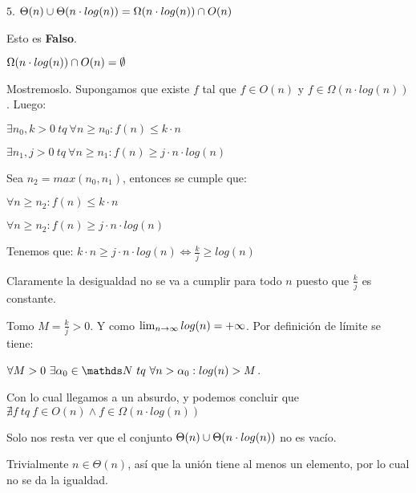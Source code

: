 \documentclass[10pt,a4paper]{article}
\begin{document}
\demoline
\demoline
\par $5.$ \ensuremath{\Theta(n) \union \Theta(n \cdot log(n))= \Omega(n \cdot log(n)) \interseccion O(n)} 
\demoline
\begin{groupIzq}{2.5em}
  \par Esto es \textbf{Falso}.
  \par \ensuremath{\Omega(n \cdot log(n)) \interseccion O(n) = \emptyset}
  \par Mostremoslo. Supongamos que existe \ensuremath{f} tal que \ensuremath{f \in O(n)} y \ensuremath{f \in \Omega(n \cdot log(n))}. Luego:
  \begin{groupIzq}{1em}
    \par \ensuremath{\exists n_0, k > 0\ tq\ \forall n \geq n_0 : f(n) \leq k \cdot n}
    \par \ensuremath{\exists n_1, j > 0\ tq\ \forall n \geq n_1 : f(n) \geq j \cdot n \cdot log(n)}
    \par Sea \ensuremath{n_2=max(n_0, n_1)}, entonces se cumple que:
    \par \ensuremath{\forall n \geq n_2 : f(n) \leq k \cdot n}
    \par \ensuremath{\forall n \geq n_2 : f(n) \geq j \cdot n \cdot log(n)}
    \par Tenemos que: \ensuremath{k \cdot n \geq j \cdot n \cdot log(n) \Leftrightarrow \frac{k}{j} \geq log(n)}
    \par Claramente la desigualdad no se va a cumplir para todo \ensuremath{n} puesto que \ensuremath{\frac{k}{j}} es constante.
    \par Tomo \ensuremath{M = \frac{k}{j} > 0}. Y como \ensuremath{\limn log(n) = +\infty}. Por definición de límite se tiene:
    \par \ensuremath{\forall M > 0 \ \exists \alpha_0 \in \nat \ tq\ \forall n > \alpha_0 : log(n) > M}.
  \end{groupIzq}
  \par Con lo cual llegamos a un absurdo, y podemos concluir que \ensuremath{\nexists f\ tq\ f \in O(n) \land f \in \Omega(n \cdot log(n))} 
  \par Solo nos resta ver que el conjunto \ensuremath{\Theta(n) \union \Theta(n \cdot log(n))} no es vacío.
  \par Trivialmente \ensuremath{n \in \Theta(n)}, así que la unión tiene al menos un elemento, por lo cual no se da la igualdad.
\end{groupIzq}





\end{document}

